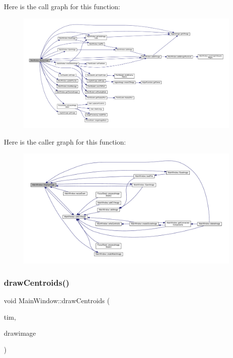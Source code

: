 Here is the call graph for this function\+:
\nopagebreak
\begin{figure}[H]
\begin{center}
\leavevmode
\includegraphics[width=350pt]{class_main_window_a8e20e1254b179ca9ec054ec908d9cc43_cgraph}
\end{center}
\end{figure}
Here is the caller graph for this function\+:
\nopagebreak
\begin{figure}[H]
\begin{center}
\leavevmode
\includegraphics[width=350pt]{class_main_window_a8e20e1254b179ca9ec054ec908d9cc43_icgraph}
\end{center}
\end{figure}
\mbox{\label{class_main_window_ad68b6789cc86ef20cd7cedd6de8d4ed2}} 
\subsubsection{\texorpdfstring{draw\+Centroids()}{drawCentroids()}}
{\footnotesize\ttfamily void Main\+Window\+::draw\+Centroids (\begin{DoxyParamCaption}\item[{\hyperlink{classtargeter_image}{targeter\+Image} \&}]{tim,  }\item[{cv\+::\+Mat \&}]{drawimage }\end{DoxyParamCaption})}

